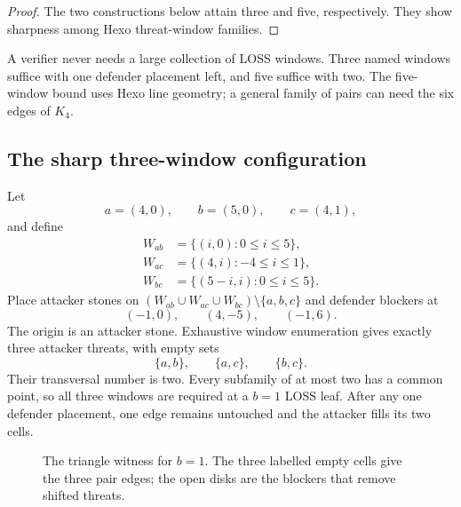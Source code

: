 \begin{proof}
The two constructions below attain three and five, respectively.  They show
sharpness among Hexo threat-window families.
\end{proof}

\begin{plainterms}
A verifier never needs a large collection of LOSS windows.  Three named
windows suffice with one defender placement left, and five suffice with two.
The five-window bound uses Hexo line geometry; a general family of pairs can
need the six edges of $K_4$.
\end{plainterms}

\subsection{The sharp three-window configuration}

Let
\[
a=(4,0),\qquad b=(5,0),\qquad c=(4,1),
\]
and define
\[
\begin{aligned}
W_{ab}&=\{(i,0):0\le i\le5\},\\
W_{ac}&=\{(4,i):-4\le i\le1\},\\
W_{bc}&=\{(5-i,i):0\le i\le5\}.
\end{aligned}
\]
Place attacker stones on
$(W_{ab}\cup W_{ac}\cup W_{bc})\setminus\{a,b,c\}$ and defender blockers at
\[
(-1,0),\qquad(4,-5),\qquad(-1,6).
\]
The origin is an attacker stone.  Exhaustive window enumeration gives exactly
three attacker threats, with empty sets
\[
\{a,b\},\qquad\{a,c\},\qquad\{b,c\}.
\]
Their transversal number is two.  Every subfamily of at most two has a common
point, so all three windows are required at a $b=1$ LOSS leaf.  After any one
defender placement, one edge remains untouched and the attacker fills its two
cells.

\begin{figure}[tbp]
  \centering
  \caption{The triangle witness for $b=1$.  The three labelled empty cells
  give the three pair edges; the open disks are the blockers that remove
  shifted threats.}
  \label{fig:witness-triangle}
\end{figure}

